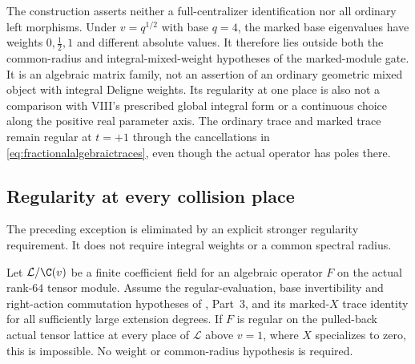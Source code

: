 The construction asserts neither a full-centralizer
identification nor all ordinary left morphisms.
Under $v=q^{1/2}$ with base $q=4$, the marked base
eigenvalues have weights $0,\tfrac12,1$ and different
absolute values. It therefore lies outside both the
common-radius and integral-mixed-weight hypotheses
of the marked-module gate.
It is an algebraic matrix family, not an assertion
of an ordinary geometric mixed object with integral
Deligne weights.
Its regularity at one place is also not a comparison
with VIII's prescribed global integral form or a
continuous choice along the positive real parameter
axis. The ordinary trace and marked trace remain
regular at $t=+1$ through the cancellations in
\eqref{eq:fractionalalgebraictraces}, even though the
actual operator has poles there.

\subsection{Regularity at every collision place}
The preceding exception is eliminated by an explicit
stronger regularity requirement. It does not require
integral weights or a common spectral radius.

\begin{finding}
\label{f:allplacestrace}
Let $\mathcal L/\C(v)$ be a finite coefficient field
for an algebraic operator $F$ on the actual rank-$64$
tensor module.
Assume the regular-evaluation, base invertibility and
right-action commutation hypotheses of ,
Part~3, and its marked-$X$ trace identity for all
sufficiently large extension degrees.
If $F$ is regular on the pulled-back actual tensor
lattice at every place of $\mathcal L$ above $v=1$,
where $X$ specializes to zero, this is impossible.
No weight or common-radius hypothesis is required.
\end{finding}

